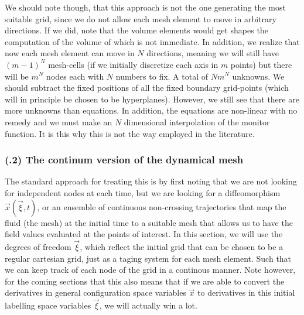 \documentclass[11pt, a4paper]{article} %
\begin{document}
We should note though, that this approach is not the one generating the most suitable grid, since we do not allow each mesh element to move in arbitrary directions. If we did, note that the volume elements would get shapes the computation of the volume of which is not immediate. In addition, we realize that now each mesh element can move in $N$ directions, meaning we will still have $(m-1)^N$ mesh-cells (if we initially discretize each axis in $m$ points) but there will be $m^N$ nodes each with $N$ numbers to fix. A total of $Nm^N$ unknowns. We should subtract the fixed positions of all the fixed boundary grid-points (which will in principle be chosen to be hyperplanes). However, we still see that there are more unknowns than equations. In addition, the equations are non-linear with no remedy and we must make an $N$ dimensional interpolation of the monitor function. It is this why this is not the way employed in the literature.

\subsubsection*{(\textgamma.2) The continum version of the dynamical mesh}
The standard approach for treating this is by first noting that we are not looking for independent nodes at each time, but we are looking for a diffeomorphism $\vec{x}(\vec{\xi},t)$, or an ensemble of continuous non-crossing trajectories that map the fluid (the mesh) at the initial time to a suitable mesh that allows us to have the field values evaluated at the points of interest. In this section, we will use the degrees of freedom $\vec{\xi}$, which reflect the initial grid that can be chosen to be a regular cartesian grid, just as a taging system for each mesh element. Such that we can keep track of each node of the grid in a continous manner. Note however, for the coming sections that this also means that if we are able to convert the derivatives in general configuration space variables $\vec{x}$ to derivatives in this initial labelling space variables $\vec{\xi}$, we will actually win a lot.
\end{document}
